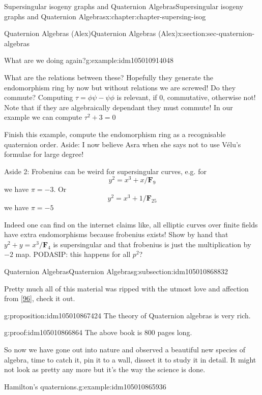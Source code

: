 \documentclass[oneside,10pt,]{book}
\numberwithin{equation}{section}
\newcommand{\FF}{\mathbf{F}}
\begin{document}
\begin{chapterptx}{Supersingular isogeny graphs and Quaternion Algebras}{}{Supersingular isogeny graphs and Quaternion Algebras}{}{}{x:chapter:chapter-supersing-isog}
\begin{sectionptx}{Quaternion Algebras (Alex)}{}{Quaternion Algebras (Alex)}{}{}{x:section:sec-quaternion-algebras}
\begin{introduction}{}
\begin{example}{What are we doing again?}{g:example:idm105010914048}
\par
What are the relations between these? Hopefully they generate the endomorphism ring by now but without relations we are screwed! Do they commute? Computing \(\tau = \phi \psi  - \psi \phi\) is relevant, if 0, commutative, otherwise not! Note that if they are algebraically dependant they must commute! In our example we can compute \(\tau^2 + 3 = 0\)%
\end{example}
Finish this example, compute the endomorphism ring as a recognisable quaternion order.%
Aside: I now believe Asra when she says not to use Vélu's formulae for large degree!%
\par
Aside 2: Frobenius can be weird for supersingular curves, e.g. for%
\begin{equation*}
y^2 = x^{3} + x/\FF_9
\end{equation*}
we have \(\pi = -3\). Or%
\begin{equation*}
y^2 = x^{3} + 1/\FF_{25}
\end{equation*}
we have \(\pi = -5\)%
\par
Indeed one can find on the internet claims like, all elliptic curves over finite fields have extra endomorphisms because frobenius exists!%
Show by hand that \(y^2 + y = x^3/\FF_4\) is supersingular and that frobenius is just the multiplication by \(-2\) map.%
PODASIP: this happens for all \(p^2\)?%
\end{introduction}%
%
%
\typeout{************************************************}
\typeout{************************************************}
%
\begin{subsectionptx}{Quaternion Algebras}{}{Quaternion Algebras}{}{}{g:subsection:idm105010868832}
\begin{introduction}{}%
Pretty much all of this material was ripped with the utmost love and affection from \hyperlink{x:biblio:bib-voight-quat}{[96]}, check it out.%
\begin{proposition}{}{}{g:proposition:idm105010867424}%
The theory of Quaternion algebras is very rich.%
\end{proposition}
\begin{proofptx}{}{g:proof:idm105010866864}
The above book is 800 pages long.%
\end{proofptx}
So now we have gone out into nature and observed a beautiful new species of algebra, time to catch it, pin it to a wall, dissect it to study it in detail. It might not look as pretty any more but it's the way the science is done.%
\begin{example}{Hamilton's quaternions.}{g:example:idm105010865936}%

\end{example}
\end{introduction}
\end{subsectionptx}
\end{sectionptx}
\end{chapterptx}
\end{document}
